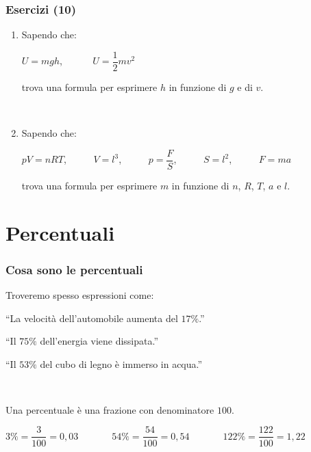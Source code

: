 \documentclass[]{beamer}
\begin{document}
\begin{frame}
\frametitle{Esercizi (10)}
\begin{enumerate}
  \item Sapendo che:
  \begin{center}
    $ U = mgh $, ~~~~~ $ U = \dfrac{1}{2}mv^2 $
  \end{center}
  trova una formula per esprimere $ h $ in funzione di $ g $ e di $ v $.

  ~

  \item Sapendo che:
  \begin{center}
    $ pV = nRT $, ~~~~~$ V = l^3 $,~~~~~ $ p = \dfrac{F}{S} $, ~~~~~$ S = l^2 $,~~~~~ $ F = ma $
  \end{center}
  trova una formula per esprimere $ m $ in funzione di $ n $, $ R $, $T$, $ a $ e $ l $.
\end{enumerate}
\end{frame}



\section{Percentuali}

\begin{frame}
\frametitle{Cosa sono le percentuali}
Troveremo spesso espressioni come:
\begin{center}
``La velocità dell'automobile aumenta del $ 17\% $.''

``Il $ 75\% $ dell'energia viene dissipata.''

``Il $ 53\% $ del cubo di legno è immerso in acqua.''\pause
\end{center}

~

\alert{Una percentuale è una frazione con denominatore $ 100 $.}
\begin{center}
$ 3\% = \dfrac{3}{100} = 0,03 $~~~~~~~$ 54\% = \dfrac{54}{100} = 0,54 $~~~~~~~$ 122\% = \dfrac{122}{100} = 1,22 $
\end{center}
\end{frame}
\end{document}
